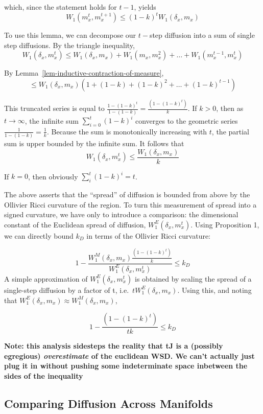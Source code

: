 \documentclass[
  letterpaper,
  DIV=11,
  numbers=noendperiod]{scrartcl}
\theoremstyle{plain}
\theoremstyle{plain}
\theoremstyle{definition}
\theoremstyle{definition}
\theoremstyle{remark}
\begin{document}
which, since the statement holds for \(t-1\), yields \[
W_1\left(m_x^t, m_x^{t+1}\right) \leq(1-k)^t W_1\left(\delta_x,m_x\right)
\]

To use this lemma, we can decompose our \(t-\)step diffusion into a sum
of single step diffusions. By the triangle inequality, \[
W_{1}(\delta_{x},m_{x}^t) \leq W_1\left(\delta_x,m_x\right) + W_{1}(m_{x},m_{x}^2) + \dots + W_{1}(m_{x}^{t-1}, m_{x}^t)
\]

By Lemma~\ref{lem-inductive-contraction-of-measure}, \[
\leq W_1\left(\delta_x,m_x\right)\left(1+(1-k)+(1-k)^2+\ldots+(1-k)^{t-1}\right)
\]

This truncated series is equal to
\(\frac{1-(1-k)^t}{1-(1-k)} = \frac{(1-(1-k)^t)}{k}\). If \(k>0\), then
as \(t \to \infty\), the infinite sum \(\sum_{i=0}^t (1-k)^i\) converges
to the geometric series \(\frac{1}{1-(1-k)} = \frac{1}{k}\). Because the
sum is monotonically increasing with \(t\), the partial sum is upper
bounded by the infinite sum. It follows that \[
W_{1}(\delta_{x},m_{x}^t) \leq \frac{W_1\left(\delta_x,m_x\right)}{k}
\]

If \(k=0\), then obviously \(\sum_{i}^t (1-k)^i = t\).

The above asserts that the ``spread'' of diffusion is bounded from above
by the Ollivier Ricci curvature of the region. To turn this measurement
of spread into a signed curvature, we have only to introduce a
comparison: the dimensional constant of the Euclidean spread of
diffusion, \(W_{1}^E(\delta_{x},m_{x}^t)\). Using Proposition 1, we can
directly bound \(k_{D}\) in terms of the Ollivier Ricci curvature:

\[
1 - \frac{W^M_1\left(\delta_x,m_x\right)\frac{(1-(1-k)^t)}{k}}{W_{1}^E(\delta_{x},m_{x}^t)} \leq k_{D}
\] A simple approximation of \(W_{1}^E(\delta_{x},m_{x}^t)\) is obtained
by scaling the spread of a single-step diffusion by a factor of t,
i.e.~\(tW_{1}^E(\delta_{x},m_{x})\). Using this, and noting that
\(W_{1}^E(\delta_{x},m_{x}) \approx W_{1}^M(\delta_{x},m_{x})\),

\[
1 - \frac{(1-(1-k)^t)}{tk} \leq k_{D}
\]

\textbf{Note: this analysis sidesteps the reality that tJ is a (possibly
egregious) \emph{overestimate} of the euclidean WSD. We can't actually
just plug it in without pushing some indeterminate space inbetween the
sides of the inequality}

\subsection{Comparing Diffusion Across
Manifolds}\label{comparing-diffusion-across-manifolds}
\end{document}
